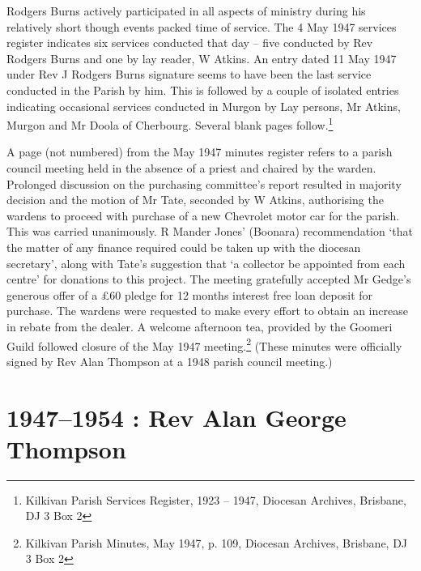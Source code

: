 Rodgers Burns actively participated in all aspects of ministry during
his relatively short though events packed time of service. The 4 May
1947 services register indicates six services conducted that day -- five
conducted by Rev Rodgers Burns and one by lay reader, W Atkins. An entry
dated 11 May 1947 under Rev J Rodgers Burns signature seems to have been
the last service conducted in the Parish by him. This is followed by a
couple of isolated entries indicating occasional services conducted in
Murgon by Lay persons, Mr Atkins, Murgon and Mr Doola of Cherbourg.
Several blank pages follow.\footnote{Kilkivan Parish Services Register,
  1923 -- 1947, Diocesan Archives, Brisbane, DJ 3 Box 2}

A page (not numbered) from the May 1947 minutes register refers to a
parish council meeting held in the absence of a priest and chaired by
the warden. Prolonged discussion on the purchasing committee's report
resulted in majority decision and the motion of Mr Tate, seconded by W
Atkins, authorising the wardens to proceed with purchase of a new
Chevrolet motor car for the parish. This was carried unanimously. R
Mander Jones' (Boonara) recommendation `that the matter of any finance
required could be taken up with the diocesan secretary', along with
Tate's suggestion that `a collector be appointed from each centre' for
donations to this project. The meeting gratefully accepted Mr Gedge's
generous offer of a \pounds60 pledge for 12 months interest free loan deposit
for purchase. The wardens were requested to make every effort to obtain
an increase in rebate from the dealer. A welcome afternoon tea, provided
by the Goomeri Guild followed closure of the May 1947
meeting.\footnote{Kilkivan Parish Minutes, May 1947, p. 109, Diocesan
  Archives, Brisbane, DJ 3 Box 2} (These minutes were officially signed
by Rev Alan Thompson at a 1948 parish council meeting.)

\printendnotes[custom]
\setcounter{endnote}{0}
\chapter{1947--1954 : Rev Alan George
Thompson}

